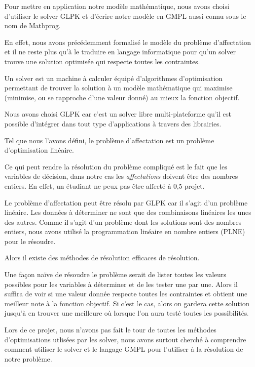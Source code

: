 \documentclass{polytech/polytech}
\begin{document}
Pour mettre en application notre modèle mathématique, nous avons choisi d'utiliser le solver GLPK et d'écrire notre modèle en GMPL aussi connu sous le nom de Mathprog.

En effet, nous avons précédemment formalisé le modèle du problème d'affectation et il ne reste plus qu'à le traduire en langage informatique pour qu'un solver trouve une solution optimisée qui respecte toutes les contraintes.

Un solver est un machine à calculer équipé d'algorithmes d'optimisation permettant de trouver la solution à un modèle mathématique qui maximise (minimise, ou se rapproche d'une valeur donné) au mieux la fonction objectif.

Nous avons choisi GLPK car c'est un solver libre multi-plateforme qu'il est possible d'intégrer dans tout type d'applications à travers des librairies.

Tel que nous l'avons défini, le problème d'affectation est un problème d'optimisation linéaire. 

Ce qui peut rendre la résolution du problème compliqué est le fait que les variables de décision, dans notre cas les \textit{affectations} doivent être des nombres entiers. En effet, un étudiant ne peux pas être affecté à 0,5 projet.

Le problème d'affectation peut être résolu par GLPK car il s'agit d'un problème linéaire. Les données à déterminer ne sont que des combinaisons linéaires les unes des autres. Comme il s'agit d'un problème dont les solutions sont des nombres entiers, nous avons utilisé la programmation linéaire en nombre entiers (PLNE) pour le résoudre. 

Alors il existe des méthodes de résolution efficaces de résolution. 

Une façon naïve de résoudre le problème serait de lister toutes les valeurs possibles pour les variables à déterminer et de les tester une par une. Alors il suffira de voir si une valeur donnée respecte toutes les contraintes et obtient une meilleur note à la fonction objectif. Si c'est le cas, alors on gardera cette solution jusqu'à en trouver une meilleure où lorsque l'on aura testé toutes les possibilités.

Lors de ce projet, nous n'avons pas fait le tour de toutes les méthodes d'optimisations utlisées par les solver, nous avons surtout cherché à comprendre comment utiliser le solver et le langage GMPL pour l'utiliser à la résolution de notre problème.
\end{document}
